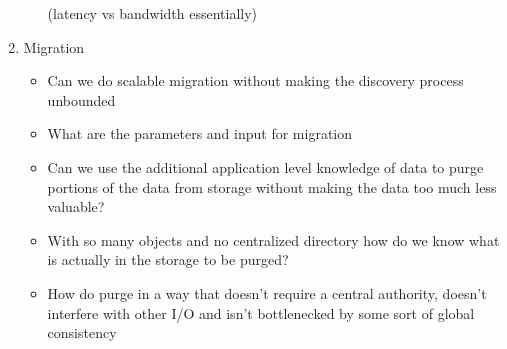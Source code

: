 \begin{enumerate}
\begin{itemize}
    (latency vs bandwidth essentially)
  \end{itemize}
\item Migration
  \begin{itemize}
  \item Can we do scalable migration without making the discovery process
    unbounded
  \item What are the parameters and input for migration
  \item Can we use the additional application level knowledge of data to purge
    portions of the data from storage without making the data too much less
    valuable?
  \item With so many objects and no centralized directory how do we know what
    is actually in the storage to be purged?
  \item How do purge in a way that doesn't require a central authority,
    doesn't interfere with other I/O and isn't bottlenecked by some sort of
    global consistency
  \end{itemize}
\end{enumerate}


